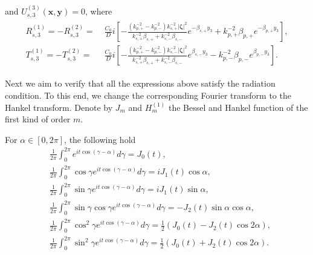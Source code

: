 \documentclass[final,reqno]{siamltex}
\newcommand{\ben}{\begin{eqnarray*}}
\newcommand{\enn}{\end{eqnarray*}}
\begin{document}
and $U_{s,3}^{(3)}(\mathbf{x},\mathbf{y})=0$, where 
\ben
  \begin{aligned}
  	R_{s,3}^{(1)}=-R_{s,3}^{(2)}=&\;\frac{C_0}{D}i\left[-\frac{(k_{p,+}^{-2}-k_{p,-}^{-2})k_{s,+}^{-2}|\boldsymbol{\zeta}|^2}{k_{s,+}^{-2}\beta_{s,+}+k_{s,-}^{-2}\beta_{s,-}}e^{-\beta_{s,+}y_3}+k_{p,+}^{-2}\beta_{p,+}e^{-\beta_{p,+}y_3}\right], \\
  T_{s,3}^{(1)}=-T_{s,3}^{(2)}=&\;\frac{C_0}{D}i\left[-\frac{(k_{p,+}^{-2}-k_{p,-}^{-2})k_{s,-}^{-2}|\boldsymbol{\zeta}|^2}{k_{s,+}^{-2}\beta_{s,+}+k_{s,-}^{-2}\beta_{s,-}}e^{\beta_{s,-}y_3}-k_{p,-}^{-2}\beta_{p,-}e^{\beta_{p,-}y_3}\right]. 
  \end{aligned}
\enn

Next we aim to verify that all the expressions above satisfy the radiation condition. To this end, we change the corresponding Fourier transform to the Hankel transform. Denote by $J_m$ and $H_m^{(1)}$ the Bessel and Hankel function of the first kind of order $m$. 
\begin{lemma}\label{lem3.5}
	For $\alpha\in[0,2\pi]$, the following hold 
	\begin{align*}
	  &\frac{1}{2\pi}\int_{0}^{2\pi}e^{it\cos(\gamma-\alpha)}d\gamma=J_0(t), \\
	  &\frac{1}{2\pi}\int_{0}^{2\pi}\cos\gamma e^{it\cos(\gamma-\alpha)}d\gamma=iJ_1(t)\cos\alpha, \\
	  &\frac{1}{2\pi}\int_{0}^{2\pi}\sin\gamma e^{it\cos(\gamma-\alpha)}d\gamma=iJ_1(t)\sin\alpha, \\
	  &\frac{1}{2\pi}\int_{0}^{2\pi}\sin\gamma\cos\gamma e^{it\cos(\gamma-\alpha)}d\gamma=-J_2(t)\sin\alpha\cos\alpha, \\
	  &\frac{1}{2\pi}\int_{0}^{2\pi}\cos^2\gamma e^{it\cos(\gamma-\alpha)}d\gamma=\frac{1}{2}\left(J_0(t)-J_2(t)\cos2\alpha\right), \\
	  &\frac{1}{2\pi}\int_{0}^{2\pi}\sin^2\gamma e^{it\cos(\gamma-\alpha)}d\gamma=\frac{1}{2}\left(J_0(t)+J_2(t)\cos2\alpha\right). 
	\end{align*}
\end{lemma}
\end{document}
